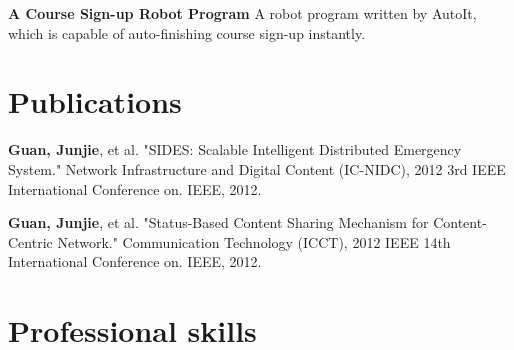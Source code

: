 \documentclass{tccv}
\begin{document}
\begin{eventlist}
     \textbf{A Course Sign-up Robot Program}\newline
     A robot program written by AutoIt, which is capable of auto-finishing course sign-up instantly.\newline\newline\newline\newline\newline\newline\newline\newline\newline\newline\newline\newline\newline\newline\newline\newline\newline\newline\newline\newline

\end{eventlist}














\section{Publications}

\textbf{Guan, Junjie}, et al. "SIDES: Scalable Intelligent Distributed Emergency System." Network Infrastructure and Digital Content (IC-NIDC), 2012 3rd IEEE International Conference on. IEEE, 2012.\newline

\textbf{Guan, Junjie}, et al. "Status-Based Content Sharing Mechanism for Content-Centric Network." Communication Technology (ICCT), 2012 IEEE 14th International Conference on. IEEE, 2012. 









\section{Professional skills}
\end{document}
